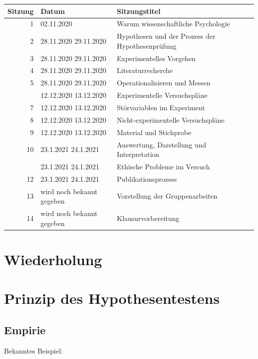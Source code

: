 \documentclass[
]{book}
\begin{document}
\begin{tabular}[t]{rll}
\toprule
Sitzung & Datum & Sitzungstitel\\
\midrule
1 & 02.11.2020 & Warum wissenschaftliche Psychologie\\
2 & 28.11.2020
29.11.2020 & Hypothesen und der Prozess der Hypothesenprüfung\\
3 & 28.11.2020
29.11.2020 & Experimentelles Vorgehen\\
4 & 28.11.2020
29.11.2020 & Literaturrecherche\\
5 & 28.11.2020
29.11.2020 & Operationalisieren und Messen\\
\addlinespace
6 & 12.12.2020
13.12.2020 & Experimentelle Versuchspläne\\
7 & 12.12.2020
13.12.2020 & Störvariablen im Experiment\\
8 & 12.12.2020
13.12.2020 & Nicht-experimentelle Versuchspläne\\
9 & 12.12.2020
13.12.2020 & Material und Stichprobe\\
10 & 23.1.2021
24.1.2021 & Auswertung, Darstellung und Interpretation\\
\addlinespace
11 & 23.1.2021
24.1.2021 & Ethische Probleme im Versuch\\
12 & 23.1.2021
24.1.2021 & Publikationsprozess\\
13 & wird noch bekannt gegeben & Vorstellung der Gruppenarbeiten\\
14 & wird noch bekannt gegeben & Klausurvorbereitung\\
\bottomrule
\end{tabular}

\hypertarget{wiederholung-8}{%
\section{Wiederholung}\label{wiederholung-8}}

\hypertarget{prinzip-des-hypothesentestens}{%
\section{Prinzip des Hypothesentestens}\label{prinzip-des-hypothesentestens}}

\hypertarget{empirie}{%
\subsection{Empirie}\label{empirie}}

Bekanntes Beispiel:
\end{document}
